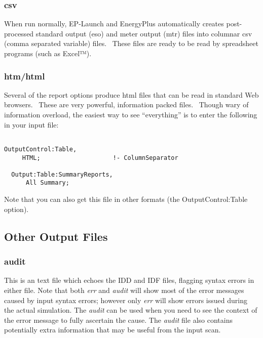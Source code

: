 \subsubsection{csv}\label{csv}

When run normally, EP-Launch and EnergyPlus automatically creates post-processed standard output (eso) and meter output (mtr) files into columnar csv (comma separated variable) files.~ These files are ready to be read by spreadsheet programs (such as Excel™).

\subsubsection{htm/html}\label{htmhtml}

Several of the report options produce html files that can be read in standard Web browsers.~ These are very powerful, information packed files.~ Though wary of information overload, the easiest way to see ``everything'' is to enter the following in your input file:

\begin{lstlisting}

OutputControl:Table,
     HTML;                    !- ColumnSeparator

  Output:Table:SummaryReports,
      All Summary;
\end{lstlisting}

Note that you can also get this file in other formats (the OutputControl:Table option).

\subsection{Other Output Files}\label{other-output-files}

\subsubsection{audit}\label{audit}

This is an text file which echoes the IDD and IDF files, flagging syntax errors in either file. Note that both \emph{err} and \emph{audit} will show most of the error messages caused by input syntax errors; however only \emph{err} will show errors issued during the actual simulation. The \emph{audit} can be used when you need to see the context of the error message to fully ascertain the cause. The \emph{audit} file also contains potentially extra information that may be useful from the input scan.

